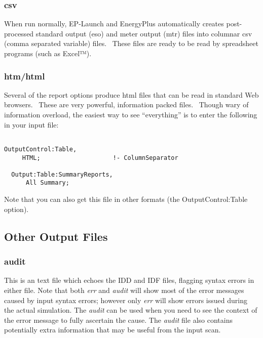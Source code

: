 \subsubsection{csv}\label{csv}

When run normally, EP-Launch and EnergyPlus automatically creates post-processed standard output (eso) and meter output (mtr) files into columnar csv (comma separated variable) files.~ These files are ready to be read by spreadsheet programs (such as Excel™).

\subsubsection{htm/html}\label{htmhtml}

Several of the report options produce html files that can be read in standard Web browsers.~ These are very powerful, information packed files.~ Though wary of information overload, the easiest way to see ``everything'' is to enter the following in your input file:

\begin{lstlisting}

OutputControl:Table,
     HTML;                    !- ColumnSeparator

  Output:Table:SummaryReports,
      All Summary;
\end{lstlisting}

Note that you can also get this file in other formats (the OutputControl:Table option).

\subsection{Other Output Files}\label{other-output-files}

\subsubsection{audit}\label{audit}

This is an text file which echoes the IDD and IDF files, flagging syntax errors in either file. Note that both \emph{err} and \emph{audit} will show most of the error messages caused by input syntax errors; however only \emph{err} will show errors issued during the actual simulation. The \emph{audit} can be used when you need to see the context of the error message to fully ascertain the cause. The \emph{audit} file also contains potentially extra information that may be useful from the input scan.

